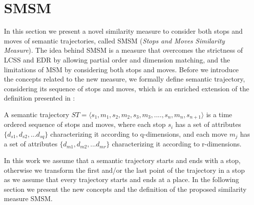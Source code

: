 %



\chapter{SMSM}\label{sec:proposed_measure}

    \begin{flushright}
         
    \end{flushright}
In this section we present a novel similarity measure to consider both stops and moves of semantic trajectories, called SMSM (\textit{Stops and Moves Similarity Measure}). The idea behind SMSM is a measure that overcomes the strictness of LCSS and EDR by allowing partial order and dimension matching, and the limitations of MSM by considering both stops and moves. Before we introduce the concepts related to the new measure, we formally define semantic trajectory, considering its sequence of stops and moves, which is an enriched extension of the definition presented in \cite{Spaccapietra:2008:CVT:1347466.1347785}:


\begin{definition}
\label{def:semantic_trajectory}
A semantic trajectory  $ST=\langle s_1, m_1, s_2, m_2, s_3,m_3, ...., s_n, m_n, s_{n+1} \rangle$ is a time ordered sequence of stops and moves, where each stop $s_i$ has a set of attributes $\{d_{s1}, d_{s2}, ...d_{sq}\}$ characterizing it according to q-dimensions, and each move $m_j$  has a set of attributes $\{d_{m1}, d_{m2}, ...d_{mr}\}$  characterizing it according to r-dimensions. 
\end{definition}

In this work we assume that a semantic trajectory starts and ends with a stop, otherwise we transform the first and/or the last point of the trajectory in a stop {as we assume that every trajectory starts and ends at a place}. In the following section we present the new concepts and the definition of the proposed similarity measure SMSM.

